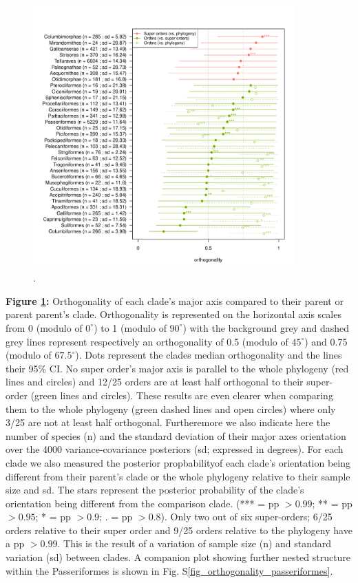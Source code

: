 \documentclass[12pt,letterpaper]{article}
\begin{document}
\bigskip

\begin{figure}[!htbp]
\centering
   \includegraphics[width=0.9\textwidth]{Figures/orthogonality_results.pdf}
\caption{.}
\label{Fig:orthogonality}
\end{figure}

\bigskip

\noindent \textbf{Figure \ref{Fig:orthogonality}:}
Orthogonality of each clade's major axis compared to their parent or parent parent's clade.
Orthogonality is represented on the horizontal axis scales from 0 (modulo of $0^\circ$) to 1 (modulo of $90^\circ$) with the background grey and dashed grey lines represent respectively an orthogonality of 0.5 (modulo of $45^\circ$) and 0.75 (modulo of $67.5^\circ$).
Dots represent the clades median orthogonality and the lines their 95\% CI.
No super order's major axis is parallel to the whole phylogeny (red lines and circles) and 12/25 orders are at least half orthogonal to their super-order (green lines and circles).
These results are even clearer when comparing them to the whole phylogeny (green dashed lines and open circles) where only 3/25 are not at least half orthogonal.
Furtheremore we also indicate here the number of species (n) and the standard deviation of their major axes orientation over the 4000 variance-covariance posteriors (sd; expressed in degrees).
For each clade we also measured the posterior propbabilityof each clade's orientation being different from their parent's clade or the whole phylogeny relative to their sample size and sd.
The stars represent the posterior probability of the clade's orientation being different from the comparison clade. (*** = pp $> 0.99$; ** = pp $>0.95$; * = pp $> 0.9$; . = pp $> 0.8$).
Only two out of six super-orders; 6/25 orders relative to their super order and 9/25 orders relative to the phylogeny have a pp $> 0.99$.
This is the result of a variation of sample size (n) and standard variation (sd) between clades. 
A companion plot showing further nested structure within the Passeriformes is shown in Fig. S\ref{fig_orthogonality_passeriformes}.
\end{document}
